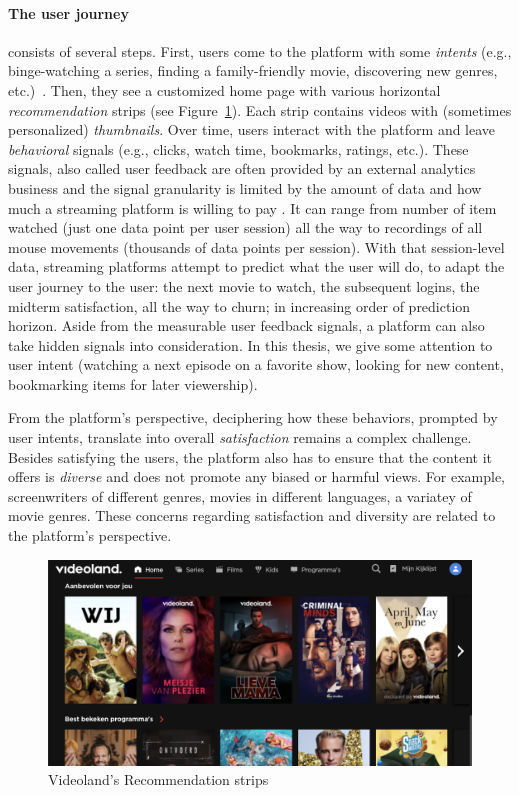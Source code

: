 \paragraph{The user journey} consists of several steps. First, users come to the platform with some \emph{intents} (e.g., binge-watching a series, finding a family-friendly movie, discovering new genres, etc.)~\cite{intent}. Then, they see a customized home page with various horizontal \emph{recommendation} strips (see Figure~\ref{fig:VLStrip}). Each strip contains videos with (sometimes personalized) \emph{thumbnails}. Over time, users interact with the platform and leave \emph{behavioral} signals (e.g., clicks, watch time, bookmarks, ratings, etc.). These signals, also called user feedback are often provided by an external analytics business and the signal granularity is limited by the amount of data and how much a streaming platform is willing to pay \tocite{}. It can range from number of item watched (just one data point per user session) all the way to recordings of all mouse movements (thousands of data points per session). With that session-level data, streaming platforms attempt to predict what the user will do, to adapt the user journey to the user: the next movie to watch, the subsequent logins, the midterm satisfaction, all the way to churn; in increasing order of prediction horizon. Aside from the measurable user feedback signals, a platform can also take hidden signals into consideration. In this thesis, we give some attention to user intent (watching a next episode on a favorite show, looking for new content, bookmarking items for later viewership).

From the platform's perspective, deciphering how these behaviors, prompted by user intents, translate into overall \emph{satisfaction} remains a complex challenge. Besides satisfying the users, the platform also has to ensure that the content it offers is \emph{diverse} and does not promote any biased or harmful views. For example, screenwriters of different genres, movies in different languages, a variatey of movie genres. These concerns regarding satisfaction and diversity are related to the platform's perspective.

\begin{figure}[h]
  \centering
  \includegraphics[width=\textwidth]{01-introduction/images/VLHome_cropped.png}
  \caption{Videoland's Recommendation strips}
  \label{fig:VLStrip}
\end{figure}

